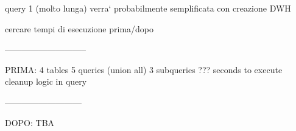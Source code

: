 query 1 (molto lunga) verra` probabilmente semplificata con creazione DWH

cercare tempi di esecuzione prima/dopo


-----------------------------

PRIMA:
    4 tables
    5 queries (union all)
    3 subqueries
    ??? seconds to execute
    cleanup logic in query
    
---------------------------

DOPO:
    TBA
    
